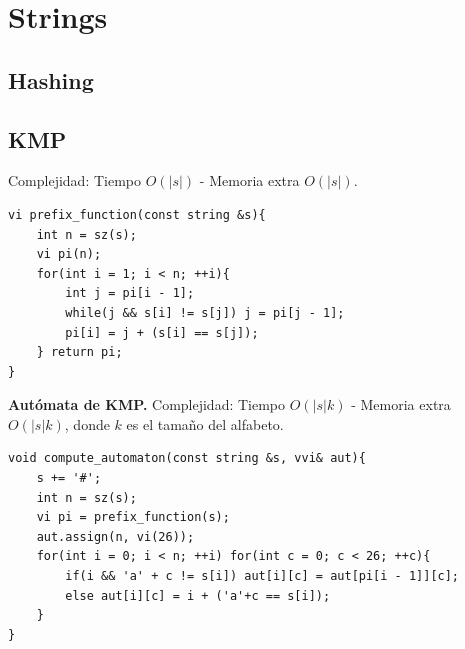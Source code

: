 \section{Strings}

\subsection{Hashing}

\subsection{KMP}
Complejidad: Tiempo $O(|s|)$ - Memoria extra $O(|s|)$.
\begin{verbatim}
vi prefix_function(const string &s){
    int n = sz(s);
    vi pi(n);
    for(int i = 1; i < n; ++i){
        int j = pi[i - 1];
        while(j && s[i] != s[j]) j = pi[j - 1];
        pi[i] = j + (s[i] == s[j]);
    } return pi;
}
\end{verbatim}



\textbf{Autómata de KMP.} Complejidad: Tiempo $O(|s|k)$ - Memoria extra $O(|s|k)$, donde $k$ es el tamaño del alfabeto.
\begin{verbatim}
void compute_automaton(const string &s, vvi& aut){
    s += '#';
    int n = sz(s);
    vi pi = prefix_function(s);
    aut.assign(n, vi(26));
    for(int i = 0; i < n; ++i) for(int c = 0; c < 26; ++c){
        if(i && 'a' + c != s[i]) aut[i][c] = aut[pi[i - 1]][c];
        else aut[i][c] = i + ('a'+c == s[i]);
    }
}
\end{verbatim}



